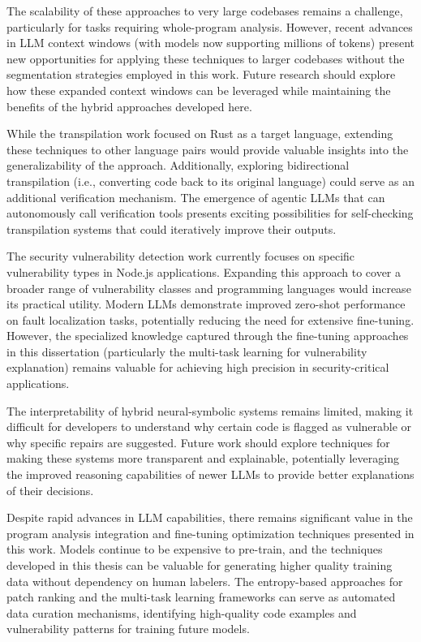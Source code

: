 The scalability of these approaches to very large codebases remains a challenge, particularly for tasks requiring whole-program analysis. However, recent advances in LLM context windows (with models now supporting millions of tokens) present new opportunities for applying these techniques to larger codebases without the segmentation strategies employed in this work. Future research should explore how these expanded context windows can be leveraged while maintaining the benefits of the hybrid approaches developed here.

While the transpilation work focused on Rust as a target language, extending these techniques to other language pairs would provide valuable insights into the generalizability of the approach. Additionally, exploring bidirectional transpilation (i.e., converting code back to its original language) could serve as an additional verification mechanism. The emergence of agentic LLMs that can autonomously call verification tools presents exciting possibilities for self-checking transpilation systems that could iteratively improve their outputs.

The security vulnerability detection work currently focuses on specific vulnerability types in Node.js applications. Expanding this approach to cover a broader range of vulnerability classes and programming languages would increase its practical utility. Modern LLMs demonstrate improved zero-shot performance on fault localization tasks, potentially reducing the need for extensive fine-tuning. However, the specialized knowledge captured through the fine-tuning approaches in this dissertation (particularly the multi-task learning for vulnerability explanation) remains valuable for achieving high precision in security-critical applications.

The interpretability of hybrid neural-symbolic systems remains limited, making it difficult for developers to understand why certain code is flagged as vulnerable or why specific repairs are suggested. Future work should explore techniques for making these systems more transparent and explainable, potentially leveraging the improved reasoning capabilities of newer LLMs to provide better explanations of their decisions.

Despite rapid advances in LLM capabilities, there remains significant value in the program analysis integration and fine-tuning optimization techniques presented in this work. Models continue to be expensive to pre-train, and the techniques developed in this thesis can be valuable for generating higher quality training data without dependency on human labelers. The entropy-based approaches for patch ranking and the multi-task learning frameworks can serve as automated data curation mechanisms, identifying high-quality code examples and vulnerability patterns for training future models.

